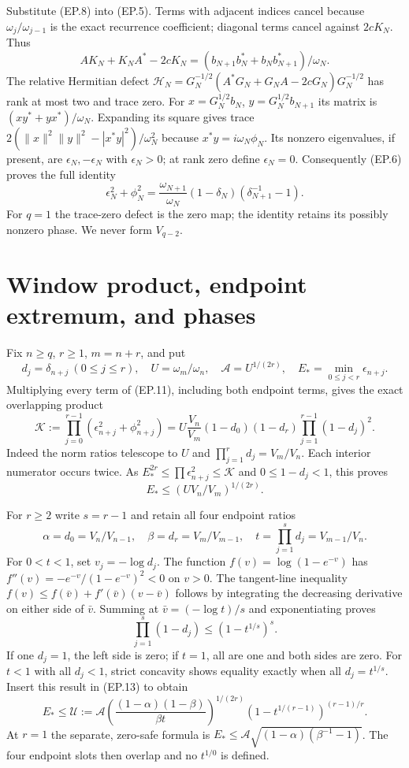 \documentclass[11pt]{article}
\begin{document}
Substitute (EP.8) into (EP.5). Terms with adjacent indices cancel
because $\omega_j/\omega_{j-1}$ is the exact recurrence coefficient;
diagonal terms cancel against $2cK_N$. Thus
\[
 AK_N+K_NA^*-2cK_N=
 (b_{N+1}b_N^*+b_Nb_{N+1}^*)/\omega_N.\tag{EP.10}
\]
The relative Hermitian defect
$\mathcal H_N=G_N^{-1/2}(A^*G_N+G_NA-2cG_N)G_N^{-1/2}$
has rank at most two and trace zero. For
$x=G_N^{1/2}b_N$, $y=G_N^{1/2}b_{N+1}$ its matrix is
$(xy^*+yx^*)/\omega_N$. Expanding its square gives trace
$2(\|x\|^2\|y\|^2-|x^*y|^2)/\omega_N^2$ because
$x^*y=i\omega_N\phi_N$. Its nonzero eigenvalues, if present,
are $\epsilon_N,-\epsilon_N$ with $\epsilon_N>0$; at rank zero
define $\epsilon_N=0$.
Consequently (EP.6) proves the full identity
\[
 \boxed{\epsilon_N^2+\phi_N^2=
 \frac{\omega_{N+1}}{\omega_N}(1-\delta_N)
                    (\delta_{N+1}^{-1}-1).}\tag{EP.11}
\]
For $q=1$ the trace-zero defect is the zero map; the identity retains
its possibly nonzero phase. We never form $V_{q-2}$.

\section{Window product, endpoint extremum, and phases}
Fix $n\ge q$, $r\ge1$, $m=n+r$, and put
\[
 d_j=\delta_{n+j}\ (0\le j\le r),\quad
 U=\omega_m/\omega_n,\quad \mathcal A=U^{1/(2r)},\quad
 E_* =\min_{0\le j<r}\epsilon_{n+j}.
\tag{EP.12}
\]
Multiplying every term of (EP.11), including both endpoint terms,
gives the exact overlapping product
\[
 \boxed{\mathcal K:=\prod_{j=0}^{r-1}(\epsilon_{n+j}^2+\phi_{n+j}^2)
 =U\frac{V_n}{V_m}(1-d_0)(1-d_r)
                 \prod_{j=1}^{r-1}(1-d_j)^2.}\tag{EP.13}
\]
Indeed the norm ratios telescope to $U$ and
$\prod_{j=1}^r d_j=V_m/V_n$. Each interior numerator occurs twice.
As $E_*^{2r}\le\prod\epsilon_{n+j}^2\le\mathcal K$ and
$0\le1-d_j<1$, this proves
\[
 E_*\le\left(UV_n/V_m\right)^{1/(2r)}.\tag{EP.14}
\]

For $r\ge2$ write $s=r-1$ and retain all four endpoint ratios
\[
 \alpha=d_0=V_n/V_{n-1},\quad
 \beta=d_r=V_m/V_{m-1},\quad t=\prod_{j=1}^s d_j=V_{m-1}/V_n.
\tag{EP.15}
\]
For $0<t<1$, set $v_j=-\log d_j$. The function
$f(v)=\log(1-e^{-v})$ has
$f''(v)=-e^{-v}/(1-e^{-v})^2<0$ on $v>0$.
The tangent-line inequality
$f(v)\le f(\bar v)+f'(\bar v)(v-\bar v)$ follows by integrating
the decreasing derivative on either side of $\bar v$. Summing at
$\bar v=(-\log t)/s$ and exponentiating proves
\[
 \prod_{j=1}^s(1-d_j)\le(1-t^{1/s})^s.\tag{EP.16}
\]
If one $d_j=1$, the left side is zero; if $t=1$, all are one and
both sides are zero. For $t<1$ with all $d_j<1$, strict concavity
shows equality exactly when all $d_j=t^{1/s}$.
Insert this result in (EP.13) to obtain
\[
 \boxed{E_*\le\mathcal U:=\mathcal A
 \left(\frac{(1-\alpha)(1-\beta)}{\beta t}\right)^{1/(2r)}
 (1-t^{1/(r-1)})^{(r-1)/r}.}\tag{EP.17}
\]
At $r=1$ the separate, zero-safe formula is
$E_*\le\mathcal A\sqrt{(1-\alpha)(\beta^{-1}-1)}$.
The four endpoint slots then overlap and no $t^{1/0}$ is defined.
\end{document}
